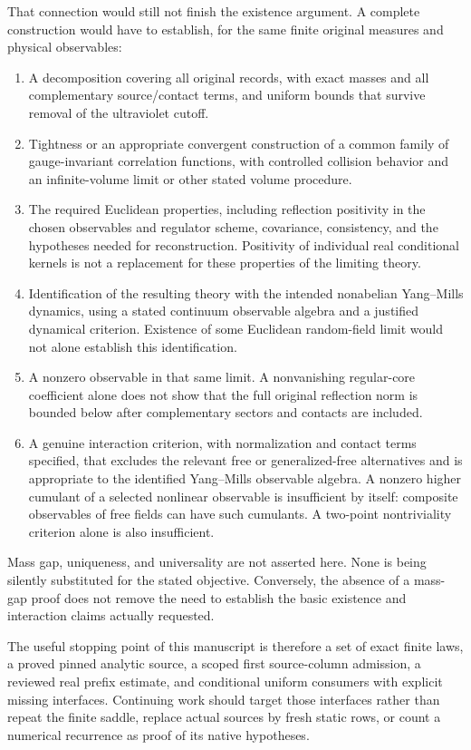 That connection would still not finish the existence argument. A complete construction would have to establish, for the same finite original measures and physical observables:
\begin{enumerate}
 \item A decomposition covering all original records, with exact masses and all complementary source/contact terms, and uniform bounds that survive removal of the ultraviolet cutoff.
 \item Tightness or an appropriate convergent construction of a common family of gauge-invariant correlation functions, with controlled collision behavior and an infinite-volume limit or other stated volume procedure.
 \item The required Euclidean properties, including reflection positivity in the chosen observables and regulator scheme, covariance, consistency, and the hypotheses needed for reconstruction. Positivity of individual real conditional kernels is not a replacement for these properties of the limiting theory.
 \item Identification of the resulting theory with the intended nonabelian Yang--Mills dynamics, using a stated continuum observable algebra and a justified dynamical criterion. Existence of some Euclidean random-field limit would not alone establish this identification.
 \item A nonzero observable in that same limit. A nonvanishing regular-core coefficient alone does not show that the full original reflection norm is bounded below after complementary sectors and contacts are included.
 \item A genuine interaction criterion, with normalization and contact terms specified, that excludes the relevant free or generalized-free alternatives and is appropriate to the identified Yang--Mills observable algebra. A nonzero higher cumulant of a selected nonlinear observable is insufficient by itself: composite observables of free fields can have such cumulants. A two-point nontriviality criterion alone is also insufficient.
\end{enumerate}
Mass gap, uniqueness, and universality are not asserted here. None is being silently substituted for the stated objective. Conversely, the absence of a mass-gap proof does not remove the need to establish the basic existence and interaction claims actually requested.

The useful stopping point of this manuscript is therefore a set of exact finite laws, a proved pinned analytic source, a scoped first source-column admission, a reviewed real prefix estimate, and conditional uniform consumers with explicit missing interfaces. Continuing work should target those interfaces rather than repeat the finite saddle, replace actual sources by fresh static rows, or count a numerical recurrence as proof of its native hypotheses.

